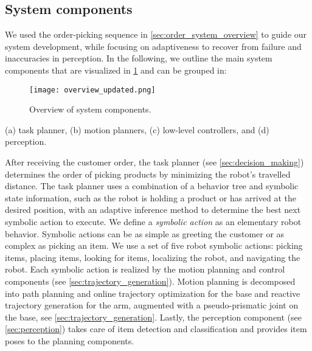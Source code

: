 \subsection{System components}

We used the order-picking sequence in \cref{sec:order_system_overview} to guide our system development, while focusing on adaptiveness to recover from failure and inaccuracies in perception. 
In the following, we outline the main
system components that are visualized in \cref{fig:software_overview} and can be grouped in: 
\begin{figure}[t]
  \begin{center}
    \texttt{[image: overview\_updated.png]}
  \end{center}
  \caption{Overview of system components.}
  \label{fig:software_overview}
\end{figure}
(a) task planner, (b) motion planners, (c) low-level controllers, and (d) perception.


After receiving the customer order, the task planner (see
\cref{sec:decision_making}) determines the order of picking
products by minimizing the robot's travelled distance. The
task planner uses a combination of a behavior tree and
symbolic state information, such as the robot is holding a
product or has arrived at the desired position,
with an adaptive inference method to determine the best next
symbolic action to execute.
We define a \textit{symbolic action} as an elementary robot
behavior. Symbolic actions can be as simple as greeting the
customer or as complex as picking an item.
We use a set of five robot
symbolic actions:
picking items, placing items, looking for items, localizing
the robot, and navigating the robot. Each symbolic action is realized
by the motion planning and control components (see
\cref{sec:trajectory_generation}). Motion planning is
decomposed into path planning and online trajectory
optimization for the base and reactive trajectory generation
for the arm, augmented with a pseudo-prismatic joint on the
base, see \cref{sec:trajectory_generation}. Lastly, the
perception component (see \cref{sec:perception}) takes care
of item detection and classification and provides item poses
to the planning components.
